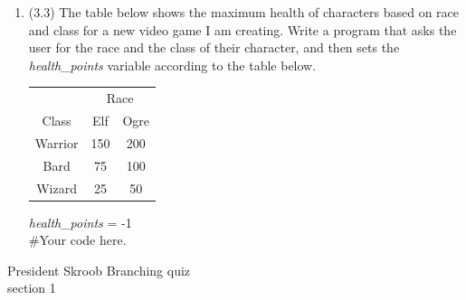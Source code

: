 \documentclass{article}
\begin{document}
\begin{enumerate}
\item (3.3)  
		The table below shows the maximum health of characters based on race and class for a new 
		video game I am creating.  Write a program that asks the user for the race and the class of 
		their character, and then sets the \textit{health\_points}	variable according to the table 
		below.
		\begin{flushright}
		\begin{tabular}{c|cc}
			& \multicolumn{2}{c}{Race}\\
			Class & Elf & Ogre \\ \hline
			Warrior & 150 & 200\\
			Bard & 75 & 100\\
			Wizard & 25 & 50 \\
		\end{tabular}
		\end{flushright}
		
		\vspace*{-6em}
		\textit{health\_points} = -1\\
		\#Your code here.
		\vspace*{3em}





\end{enumerate}
\pagebreak
President Skroob \hfill Branching quiz\\
section 1\\
\end{document}
